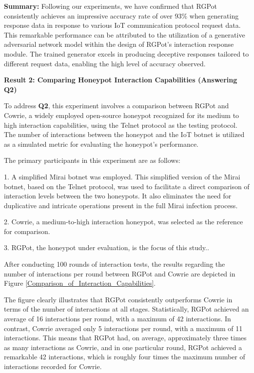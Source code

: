 \documentclass[journal]{IEEEtai}
\begin{document}
\textbf{Summary:}
Following our experiments, we have confirmed that RGPot consistently achieves an impressive accuracy rate of over 93\% when generating response data in response to various IoT communication protocol request data. 
This remarkable performance can be attributed to the utilization of a generative adversarial network model within the design of RGPot's interaction response module. 
The trained generator excels in producing deceptive responses tailored to different request data, enabling the high level of accuracy observed.





\textbf{Result 2: Comparing Honeypot Interaction Capabilities (Answering Q2)}

To address \textbf{Q2}, this experiment involves a comparison between RGPot and Cowrie, a widely employed open-source honeypot recognized for its medium to high interaction capabilities, using the Telnet protocol as the testing protocol. 
The number of interactions between the honeypot and the IoT botnet is utilized as a simulated metric for evaluating the honeypot's performance.

The primary participants in this experiment are as follows:

1. A simplified Mirai botnet\cite{20195007827865} was employed. 
This simplified version of the Mirai botnet, based on the Telnet protocol, was used to facilitate a direct comparison of interaction levels between the two honeypots. 
It also eliminates the need for duplicative and intricate operations present in the full Mirai infection process.

2. Cowrie, a medium-to-high interaction honeypot, was selected as the reference for comparison.

3. RGPot, the honeypot under evaluation, is the focus of this study..


After conducting 100 rounds of interaction tests, the results regarding the number of interactions per round between RGPot and Cowrie are depicted in Figure \ref{Comparison_of_Interaction_Capabilities}.

The figure clearly illustrates that RGPot consistently outperforms Cowrie in terms of the number of interactions at all stages. Statistically, RGPot achieved an average of 16 interactions per round, with a maximum of 42 interactions. 
In contrast, Cowrie averaged only 5 interactions per round, with a maximum of 11 interactions. 
This means that RGPot had, on average, approximately three times as many interactions as Cowrie, and in one particular round, RGPot achieved a remarkable 42 interactions, which is roughly four times the maximum number of interactions recorded for Cowrie.
\end{document}
